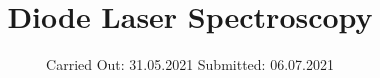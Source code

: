 



\subject{V60}  %
\title{Diode Laser Spectroscopy} %
\date{%
  Carried Out: 31.05.2021
  \hspace{3em}
  Submitted: 06.07.2021
}



\maketitle
\thispagestyle{empty}
\tableofcontents
\newpage




%
%

\printbibliography{}


